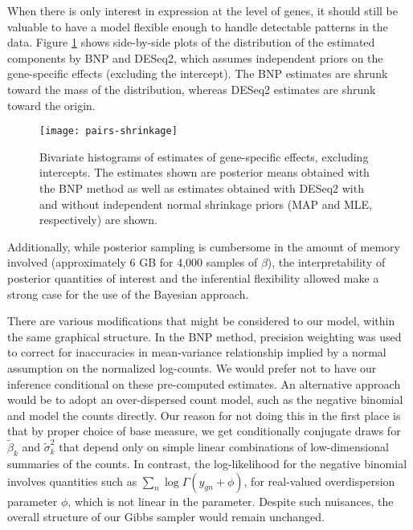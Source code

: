 When there is only interest in expression at the level of genes, it should still be valuable to have a model flexible enough to handle detectable patterns in the data. Figure \ref{all-shrink} shows side-by-side plots of the distribution of the estimated components by BNP and DESeq2, which assumes independent priors on the gene-specific effects (excluding the intercept). The BNP estimates are shrunk toward the mass of the distribution, whereas DESeq2 estimates are shrunk toward the origin.


\begin{landscape}
\centering
\begin{figure}
\texttt{[image: pairs-shrinkage]}
\caption{Bivariate histograms of estimates of gene-specific effects, excluding intercepts. The estimates shown are posterior means obtained with the BNP method as well as estimates obtained with DESeq2 with and without independent normal shrinkage priors (MAP and MLE, respectively) are shown.}
\label{all-shrink}
\end{figure}
\end{landscape}

Additionally, while posterior sampling is cumbersome in the amount of memory involved (approximately 6 GB for 4,000 samples of $\beta$), the interpretability of posterior quantities of interest and the inferential flexibility allowed make a strong case for the use of the Bayesian approach.



There are various modifications that might be considered to our model, within the same graphical structure. In the BNP method, precision weighting was used to correct for inaccuracies in mean-variance relationship implied by a normal assumption on the normalized log-counts. We would prefer not to have our inference conditional on these pre-computed estimates. An alternative approach would be to adopt an over-dispersed count model, such as the negative binomial and model the counts directly. Our reason for not doing this in the first place is that by proper choice of base measure, we get conditionally conjugate draws for $\tilde{\beta}_k$ and $\tilde{\sigma}^2_k$ that depend only on simple linear combinations of low-dimensional summaries of the counts. In contrast, the log-likelihood for the negative binomial involves quantities such as $\sum_n \log \Gamma(y_{gn}+\phi)$, for real-valued overdispersion parameter $\phi$, which is not linear in the parameter. Despite such nuisances, the overall structure of our Gibbs sampler would remain unchanged.

